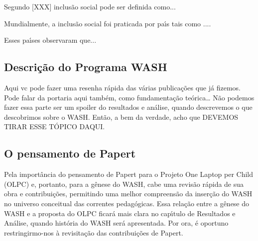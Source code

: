 \documentclass[
12pt,		%
openright,	%
twoside,  %
a4paper,			%
chapter=TITLE,		%
english,			%
french,				%
spanish,			%
brazil				%
]{USPSC-classe/USPSC}
\begin{document}
Segundo [XXX] inclus\~ao social pode ser definida como...










Mundialmente, a inclus\~ao social foi praticada por pa\'{\i}s tais como ....










Esses pa\'{\i}ses observaram que...










\subsection[Descri\c{c}\~ao do Programa WASH]{Descri\c{c}\~ao do Programa WASH}\label{Descri\c{c}\~ao do Programa WASH}
Aqui vc pode fazer uma resenha r\'apida das v\'arias publica\c{c}\~oes que j\'a fizemos. Pode falar da portaria aqui tamb\'em, como fundamenta\c{c}\~ao te\'orica… N\~ao podemos fazer essa parte ser um spoiler do resultados e an\'alise, quando descrevemos o que descobrimos sobre o WASH. Ent\~ao, a bem da verdade, acho que DEVEMOS TIRAR ESSE T\'OPICO DAQUI.










\subsection[O pensamento de Papert]{O pensamento de Papert}\label{O pensamento de Papert}
Pela import\^ancia do pensamento de Papert para o Projeto One Laptop per Child (OLPC) e, portanto, para a g\^enese do WASH, cabe uma revis\~ao r\'apida de sua obra e contribui\c{c}\~oes, permitindo uma melhor compreens\~ao da inser\c{c}\~ao do WASH no universo conceitual das correntes pedag\'ogicas. Essa rela\c{c}\~ao entre a g\^enese do WASH e a proposta do OLPC ficar\'a mais clara no cap\'{\i}tulo de Resultados e An\'alise, quando hist\'oria do WASH ser\'a apresentada. Por ora, \'e oportuno restringirmo-nos \`a revisita\c{c}\~ao das contribui\c{c}\~oes de Papert.
\end{document}
